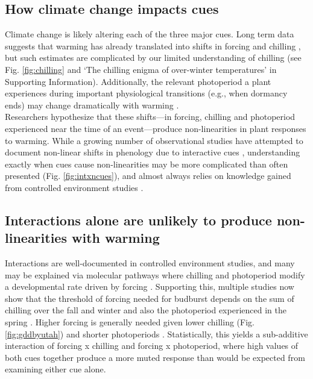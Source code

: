 \documentclass[11pt,letter]{article}
\begin{document}
\subsection{How climate change impacts cues}
Climate change is likely altering each of the three major cues. Long term data suggests that warming has already translated into shifts in forcing and chilling \citep{fu2015,piao2017}, but such estimates are complicated by our limited understanding of chilling (see Fig. \ref{fig:chilling} and `The chilling enigma of over-winter temperatures' in Supporting Information). Additionally, the relevant photoperiod a plant experiences during important physiological transitions (e.g., when dormancy ends) may change dramatically with warming \citep{ospreephoto}. \\ %

Researchers hypothesize that these shifts---in forcing, chilling and photoperiod experienced near the time of an event---produce non-linearities in plant responses to warming. While a growing number of observational studies have attempted to document non-linear shifts in phenology due to interactive cues \citep{fu2015,gauzere2019}, understanding exactly when cues cause non-linearities may be more complicated than often presented (Fig. \ref{fig:intxncues}), and almost always relies on knowledge gained from controlled environment studies \citep[e.g.,][]{fu2015,richardson2018,gauzere2019}.

\subsection{Interactions alone are unlikely to produce non-linearities with warming}
Interactions are well-documented in controlled environment studies, and many may be explained via molecular pathways where chilling and photoperiod modify a developmental rate driven by forcing \citep{Chew:2012pd}. Supporting this, multiple studies now show that the threshold of forcing needed for budburst depends on the sum of chilling over the fall and winter and also the photoperiod experienced in the spring \citep[e.g.,][]{zohner2014,flynn2018}. Higher forcing is generally needed given lower chilling (Fig. \ref{fig:gddbyutah}) and shorter photoperiods \citep{Basler:2014aa,fu2019}. Statistically, this yields a sub-additive interaction of forcing x chilling and forcing x photoperiod, where high values of both cues together produce a more muted response than would be expected from examining either cue alone.\\
\end{document}
